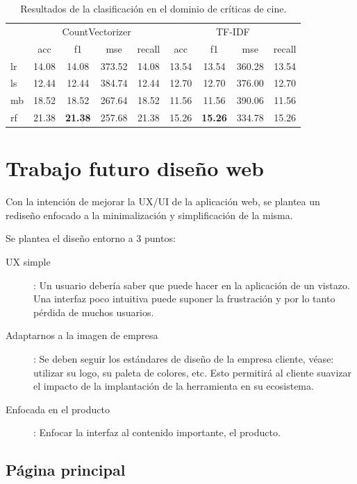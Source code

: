 \begin{table}[H]
	\centering
	\begin{tabular}{|l|cccc|cccc|}
		\hline
		& \multicolumn{4}{c|}{CountVectorizer} & \multicolumn{4}{c|}{TF-IDF} \\
		\cline{2-9}
		&    acc &     f1 &    mse &  recall & acc &     f1 &    mse &  recall \\
		\hline
		lr      &  14.08 &  14.08 &  373.52 &   14.08 &  13.54 &  13.54 &  360.28 &   13.54\\
		ls      &  12.44 &  12.44 &  384.74 &   12.44 &  12.70 &  12.70 &  376.00 &   12.70\\
		mb      &  18.52 &  18.52 &  267.64 &   18.52 &  11.56 &  11.56 &  390.06 &   11.56 \\
		rf      &  21.38 &  \textbf{21.38} &  257.68 &   21.38 &  15.26 &  \textbf{15.26} &  334.78 &   15.26 \\
		\hline
	\end{tabular}
	\caption{Resultados de la clasificación en el dominio de críticas de cine.}
	\label{result-cv-test-5-clases-cine}
\end{table}

\section{Trabajo futuro diseño web}

Con la intención de mejorar la UX/UI de la aplicación web, se plantea un rediseño enfocado a la minimalización y simplificación de la misma.

Se plantea el diseño entorno a 3 puntos:

\begin{description}
	\item [UX simple]: Un usuario debería saber que puede hacer en la aplicación de un vistazo. Una interfaz poco intuitiva puede suponer la frustración y por lo tanto pérdida de muchos usuarios.
	\item [Adaptarnos a la imagen de empresa]: Se deben seguir los estándares de diseño de la empresa cliente, véase: utilizar su logo, su paleta de colores, etc. Esto permitirá al cliente suavizar el impacto de la implantación de la herramienta en su ecosistema.
	\item [Enfocada en el producto]: Enfocar la interfaz al contenido importante, el producto.
\end{description}

\subsection{Página principal}

